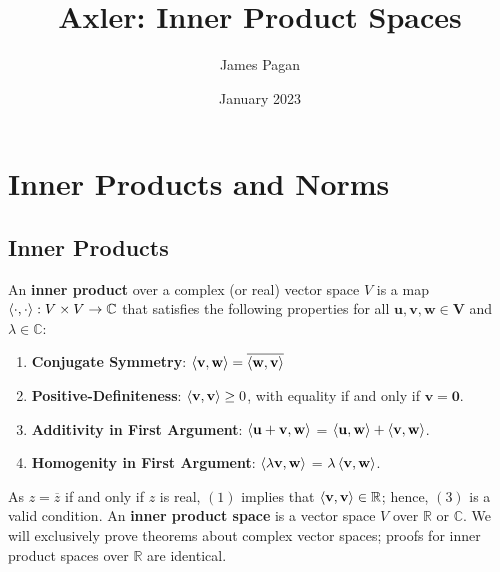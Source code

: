 \documentclass[11pt]{article}
\title{Axler: Inner Product Spaces}
\author{James Pagan}
\date{January 2023}
\renewcommand{\vec}[1]{\mathbf{#1}}
\newcommand{\conjugate}[1]{\overline{#1}}
\begin{document}
\maketitle
\tableofcontents
\newpage


\section{Inner Products and Norms}


\subsection{Inner Products}

An \textbf{inner product} over a complex (or real) vector space $V$ is a map $\ev{\cdot, \cdot} : V \times V \to \mathbb{C}$ that satisfies the following properties for all $\vec{u}, \vec{v}, \vec{w} \in \vec{V}$ and $\lambda \in \mathbb{C}$:
\begin{enumerate}
	\item \textbf{Conjugate Symmetry}: $\ev{\vec{v}, \vec{w}} = \conjugate{\ev{\vec{w}, \vec{v}}}$
	\item \textbf{Positive-Definiteness}: $\ev{\vec{v}, \vec{v}} \ge 0$, with equality if and only if $\vec{v} = \vec{0}$.
	\item \textbf{Additivity in First Argument}: $\ev{\vec{u} + \vec{v}, \vec{w}}$ = $\ev{\vec{u}, \vec{w}} + \ev{\vec{v}, \vec{w}}$.
	\item \textbf{Homogenity in First Argument}: $\ev{\lambda \vec{v}, \vec{w}}$ = $\lambda \ev{\vec{v}, \vec{w}}$.
\end{enumerate}
As $z = \conjugate{z}$ if and only if $z$ is real, $(1)$ implies that $\ev{\vec{v}, \vec{v}} \in \mathbb{R}$; hence, $(3)$ is a valid condition. An \textbf{inner product space} is a vector space $V$ over $\mathbb{R}$ or $\mathbb{C}$. We will exclusively prove theorems about complex vector spaces; proofs for inner product spaces over $\mathbb{R}$ are identical.
\end{document}
